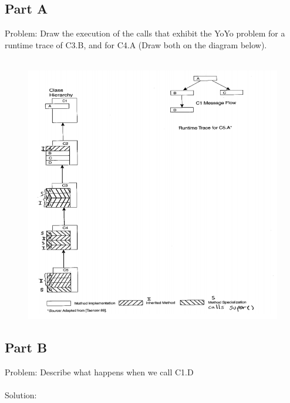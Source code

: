 \documentclass{article}
\begin{document}
\subsection*{Part A}
Problem: Draw the execution of the calls that exhibit the YoYo problem for a runtime trace of
C3.B, and for C4.A (Draw both on the diagram below). \\\\
\begin{figure}[h]
	\centering
	\includegraphics[width=6in]{yo-yo-diagram.png}
\end{figure}

\subsection*{Part B}
Problem: Describe what happens when we call C1.D \\\\
Solution: 

\newpage
\end{document}
